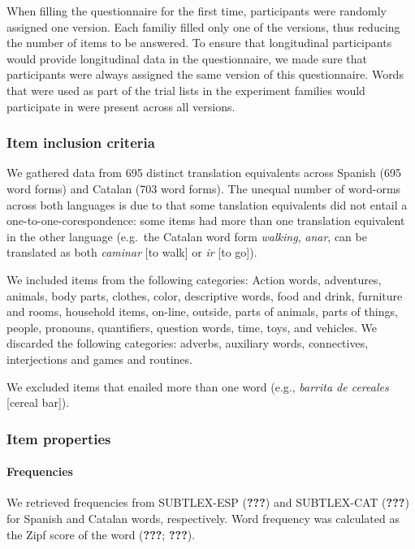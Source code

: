 \documentclass[english,man,man,floatsintext]{apa6}
\begin{document}
When filling the questionnaire for the first time, participants were randomly assigned one version. Each familiy filled only one of the versions, thus reducing the number of items to be answered. To ensure that longitudinal participants would provide longitudinal data in the questionnaire, we made sure that participants were always assigned the same version of this questionnaire. Words that were used as part of the trial lists in the experiment families would participate in were present across all versions.

\hypertarget{item-inclusion-criteria}{%
\subsubsection{Item inclusion criteria}\label{item-inclusion-criteria}}

We gathered data from 695 distinct translation equivalents across Spanish (695 word forms) and Catalan (703 word forms). The unequal number of word-orms across both languages is due to that some tanslation equivalents did not entail a one-to-one-corespondence: some items had more than one translation equivalent in the other language (e.g.~the Catalan word form \emph{walking}, \emph{anar}, can be translated as both \emph{caminar} {[}to walk{]} or \emph{ir} {[}to go{]}).

We included items from the following categories: Action words, adventures, animals, body parts, clothes, color, descriptive words, food and drink, furniture and rooms, household items, on-line, outside, parts of animals, parts of things, people, pronouns, quantifiers, question words, time, toys, and vehicles. We discarded the following categories: adverbs, auxiliary words, connectives, interjections and games and routines.

We excluded items that enailed more than one word (e.g., \emph{barrita de cereales} {[}cereal bar{]}).

\hypertarget{item-properties}{%
\subsubsection{Item properties}\label{item-properties}}

\hypertarget{frequencies}{%
\paragraph{Frequencies}\label{frequencies}}

We retrieved frequencies from SUBTLEX-ESP ({\textbf{???}}) and SUBTLEX-CAT ({\textbf{???}}) for Spanish and Catalan words, respectively. Word frequency was calculated as the Zipf score of the word ({\textbf{???}}; {\textbf{???}}).
\end{document}
